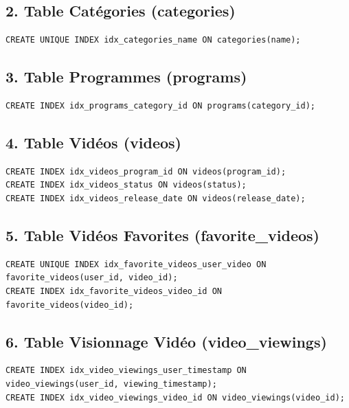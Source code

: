 \documentclass[a4paper, 12pt]{article}
\begin{document}
\subsection*{2. Table Catégories (categories)}

\begin{lstlisting}
CREATE UNIQUE INDEX idx_categories_name ON categories(name);
\end{lstlisting}

\subsection*{3. Table Programmes (programs)}

\begin{lstlisting}
CREATE INDEX idx_programs_category_id ON programs(category_id);
\end{lstlisting}

\subsection*{4. Table Vidéos (videos)}

\begin{lstlisting}
CREATE INDEX idx_videos_program_id ON videos(program_id);
CREATE INDEX idx_videos_status ON videos(status);
CREATE INDEX idx_videos_release_date ON videos(release_date);
\end{lstlisting}

\subsection*{5. Table Vidéos Favorites (favorite\_videos)}

\begin{lstlisting}
CREATE UNIQUE INDEX idx_favorite_videos_user_video ON favorite_videos(user_id, video_id);
CREATE INDEX idx_favorite_videos_video_id ON favorite_videos(video_id);
\end{lstlisting}

\subsection*{6. Table Visionnage Vidéo (video\_viewings)}

\begin{lstlisting}
CREATE INDEX idx_video_viewings_user_timestamp ON video_viewings(user_id, viewing_timestamp);
CREATE INDEX idx_video_viewings_video_id ON video_viewings(video_id);
\end{lstlisting}
\end{document}
